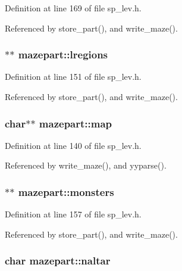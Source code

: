 Definition at line 169 of file sp\+\_\+lev.\+h.



Referenced by store\+\_\+part(), and write\+\_\+maze().

\hypertarget{structmazepart_a6a10fd5495df1c0a1927f01ef77c37b5}{
\subsubsection[{lregions}]{$\ast$$\ast$ mazepart\+::lregions}}\label{structmazepart_a6a10fd5495df1c0a1927f01ef77c37b5}


Definition at line 151 of file sp\+\_\+lev.\+h.



Referenced by store\+\_\+part(), and write\+\_\+maze().

\hypertarget{structmazepart_acc1c2da46f6ad2f4aa8c8acf6d0c784e}{
\subsubsection[{map}]{\setlength{\rightskip}{0pt plus 5cm}char$\ast$$\ast$ mazepart\+::map}}\label{structmazepart_acc1c2da46f6ad2f4aa8c8acf6d0c784e}


Definition at line 140 of file sp\+\_\+lev.\+h.



Referenced by write\+\_\+maze(), and yyparse().

\hypertarget{structmazepart_af711ec15871a8b9b8cc5222ea5c87591}{
\subsubsection[{monsters}]{$\ast$$\ast$ mazepart\+::monsters}}\label{structmazepart_af711ec15871a8b9b8cc5222ea5c87591}


Definition at line 157 of file sp\+\_\+lev.\+h.



Referenced by store\+\_\+part(), and write\+\_\+maze().

\hypertarget{structmazepart_a9dfb15fb25c3ef56505dd29d93eb0350}{
\subsubsection[{naltar}]{\setlength{\rightskip}{0pt plus 5cm}char mazepart\+::naltar}}\label{structmazepart_a9dfb15fb25c3ef56505dd29d93eb0350}


